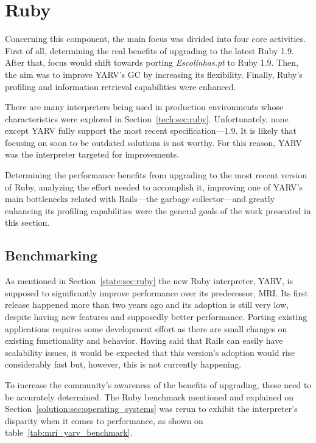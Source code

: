 \section{Ruby} %
\label{solution:sec:ruby}
Concerning this component, the main focus was divided into four core activities. First of all, determining the real benefits of upgrading to the latest Ruby 1.9. After that, focus would shift towards porting \textit{Escolinhas.pt} to Ruby 1.9. Then, the aim was to improve YARV's GC by increasing its flexibility. Finally, Ruby's profiling and information retrieval capabilities were enhanced.

There are many interpreters being used in production environments whose characteristics were explored in Section~\ref{tech:sec:ruby}. Unfortunately, none except YARV fully support the most recent specification---1.9. It is likely that focusing on soon to be outdated solutions is not worthy. For this reason, YARV was the interpreter targeted for improvements.

Determining the performance benefits from upgrading to the most recent version of Ruby, analyzing the effort needed to accomplish it, improving one of YARV's main bottlenecks related with Rails---the garbage collector---and greatly enhancing its profiling capabilities were the general goals of the work presented in this section.

\subsection{Benchmarking}
As mentioned in Section~\ref{state:sec:ruby} the new Ruby interpreter, YARV, is supposed to significantly improve performance over its predecessor, MRI. Its first release happened more than two years ago and its adoption is still very low, despite having new features and supposedly better performance. Porting existing applications requires some development effort as there are small changes on existing functionality and behavior. Having said that Rails can easily have scalability issues, it would be expected that this version's adoption would rise considerably fast but, however, this is not currently happening.

To increase the community's awareness of the benefits of upgrading, these need to be accurately determined. The Ruby benchmark mentioned and explained on Section~\ref{solution:sec:operating_systems} was rerun to exhibit the interpreter's disparity when it comes to performance, as shown on table~\ref{tab:mri_yarv_benchmark}.

